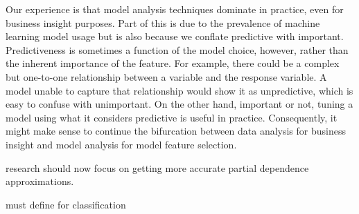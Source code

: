 \documentclass[11pt]{article}
\begin{document}
Our experience is that model analysis techniques dominate in practice, even for business insight purposes. Part of this is due to the prevalence of machine learning model usage but is also because we conflate predictive with important.  Predictiveness is sometimes a function of the model choice, however, rather than the inherent importance of the feature. For example, there could be a complex but one-to-one relationship between a variable and the response variable. A model unable to capture that relationship would show it as unpredictive, which is easy to confuse with unimportant.  On the other hand, important or not, tuning a model using what it considers predictive is useful in practice. Consequently, it might make sense to continue the bifurcation between data analysis for business insight and model analysis for model feature selection.

research should now focus on getting more accurate partial dependence approximations.

must define for classification

\vskip 0.2in

\end{document}
